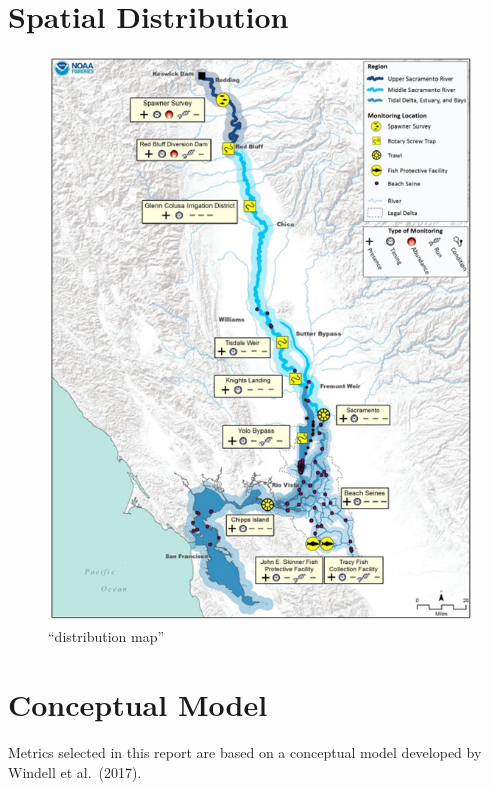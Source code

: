 \documentclass[
]{book}
\theoremstyle{definition}
\theoremstyle{definition}
\theoremstyle{definition}
\theoremstyle{definition}
\theoremstyle{remark}
\begin{document}
\hypertarget{spatial-distribution}{%
\section{Spatial Distribution}\label{spatial-distribution}}

\begin{figure}
\centering
\includegraphics{figures/map_sac_river_delta_bay.png}
\caption{``distribution map''}
\end{figure}

\hypertarget{conceptual-model}{%
\section{Conceptual Model}\label{conceptual-model}}

Metrics selected in this report are based on a conceptual model developed by Windell et al.~(2017).
\end{document}
